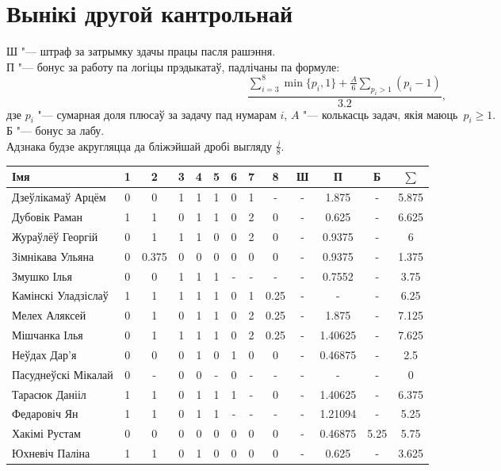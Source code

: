 \documentclass[12pt, a4paper]{extarticle}
\begin{document}
    \section{Вынікі другой кантрольнай}
    \noindent Ш "--- штраф за затрымку здачы працы пасля рашэння. \\
    П "--- бонус за работу па логіцы прэдыкатаў, падлічаны па формуле:
    $$\dfrac{\sum \limits _{i=3} ^8 \min\{p_i, 1\} + \frac{A}{6} \sum \limits _{p_i > 1} (p_i - 1)}{3.2},$$
    дзе $p_i$ "--- сумарная доля плюсаў за задачу пад нумарам $i$, $A$ "--- колькасць задач, якія маюць~$p_i \geqslant 1$. \\
    Б "--- бонус за лабу. \\
    Адзнака будзе акругляцца да бліжэйшай дробі выгляду $\frac{j}{8}$.
    \begin{table}[H]
		\begin{tabular}{|l|c|c|c|c|c|c|c|c|c|c|c|c|}
			\hline
			Імя                 &  1 &   2   & 3 & 4 & 5 & 6 & 7 &  8   & Ш &    П    &  Б   & $\sum$ \\ \hline
			Дзеўлікамаў Арцём   &  0 &   0   & 1 & 1 & 1 & 0 & 1 &  -   & - &  1.875  &  -   & 5.875  \\ \hline
			Дубовік Раман       &  1 &   1   & 0 & 1 & 1 & 0 & 2 &  0   & - &  0.625  &  -   & 6.625  \\ \hline
			Жураўлёў Георгій    &  0 &   1   & 1 & 1 & 0 & 0 & 2 &  0   & - & 0.9375  &  -   &   6    \\ \hline
			Зімнікава Ульяна    &  0 & 0.375 & 0 & 0 & 0 & 0 & 0 &  0   & - & 0.9375  &  -   & 1.375  \\ \hline
			Змушко Ілья         &  0 &   0   & 1 & 1 & 1 & - & - &  -   & - & 0.7552  &  -   &  3.75  \\ \hline
			Камінскі Уладзіслаў &  1 &   1   & 1 & 1 & 1 & 0 & 1 & 0.25 & - &    -    &  -   &  6.25  \\ \hline
			Мелех Аляксей       &  0 &   1   & 0 & 1 & 1 & 0 & 2 & 0.25 & - &  1.875  &  -   & 7.125  \\ \hline
			Мішчанка Ілья       &  0 &   1   & 1 & 1 & 1 & 0 & 2 & 0.25 & - & 1.40625 &  -   & 7.625  \\ \hline
			Неўдах Дар'я        &  0 &   0   & 0 & 1 & 0 & 1 & 0 &  0   & - & 0.46875 &  -   &  2.5   \\ \hline
			Пасуднеўскі Мікалай &  0 &   -   & 0 & 0 & - & 0 & - &  -   & - &    -    &  -   &   0    \\ \hline
			Тарасюк Данііл      &  1 &   1   & 0 & 1 & 1 & 1 & - &  0   & - & 1.40625 &  -   & 6.375  \\ \hline
			Федаровіч Ян        &  1 &   1   & 0 & 1 & 1 & - & - &  -   & - & 1.21094 &  -   &  5.25  \\ \hline
			Хакімі Рустам       &  0 &   0   & 0 & 0 & 0 & 0 & 0 &  0   & - & 0.46875 & 5.25 &  5.75  \\ \hline
			Юхневіч Паліна      &  1 &   1   & 0 & 1 & 0 & 0 & 0 &  0   & - &  0.625  &  -   & 3.625  \\ \hline
		\end{tabular}
    \end{table}
\end{document}
